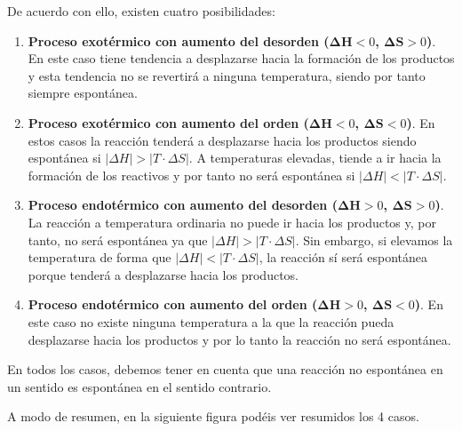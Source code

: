 De acuerdo con ello, existen cuatro posibilidades:

\begin{enumerate}[label=\numberballmDarkTeal]
        \item \textbf{Proceso exotérmico con aumento del desorden (\(\bm{\Delta H} < 0 \), \(\bm{\Delta S} > 0 \))}.
        En este caso tiene tendencia a desplazarse hacia la formación de los productos y esta tendencia no se revertirá a ninguna temperatura, siendo por tanto siempre espontánea.
        \item \textbf{Proceso exotérmico con aumento del orden (\(\bm{\Delta H} < 0 \), \(\bm{\Delta S} < 0 \))}.
        En estos casos la reacción tenderá a desplazarse hacia los productos siendo espontánea si \(|\Delta H| > |T\cdot \Delta S|\).
        A temperaturas elevadas, tiende a ir hacia la formación de los reactivos y por tanto no será espontánea si \(|\Delta H| < |T\cdot \Delta S|\).
        \item \textbf{Proceso endotérmico con aumento del desorden (\(\bm{\Delta H} > 0 \), \(\bm{\Delta S} > 0 \))}. La reacción a temperatura ordinaria no puede ir hacia los productos y, por tanto, no será espontánea ya que  \(|\Delta H| > |T\cdot \Delta S|\).
        Sin embargo, si elevamos la temperatura de forma que \(|\Delta H| < |T\cdot \Delta S|\), la reacción sí será espontánea porque tenderá a desplazarse hacia los productos.
        \item \textbf{Proceso endotérmico con aumento del orden (\(\bm{\Delta H} > 0 \), \(\bm{\Delta S} < 0 \))}.
        En este caso no existe ninguna temperatura a la que la reacción pueda desplazarse hacia los productos y por lo tanto la reacción no será espontánea.
\end{enumerate}

En todos los casos, debemos tener en cuenta que una reacción no espontánea en un sentido es espontánea en el sentido contrario.

A modo de resumen, en la siguiente figura podéis ver resumidos los 4 casos.

